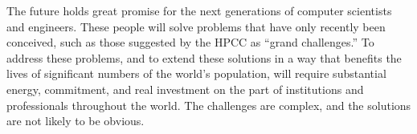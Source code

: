 The future holds great promise for the next generations of
computer scientists and engineers. These people will solve
problems that have only recently been conceived, such as those
suggested by the HPCC as ``grand challenges.'' To address these
problems, and to extend these solutions in a way that benefits
the lives of significant numbers of the world's population, will
require substantial energy, commitment, and real investment on
the part of institutions and professionals throughout the world.
The challenges are complex, and the solutions are not likely to
be obvious.






%
%
%
%
%
%
%
%
%
%

